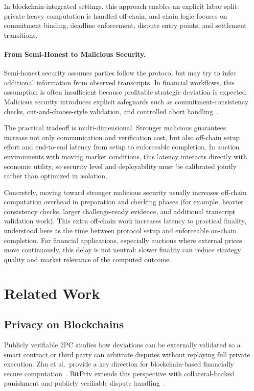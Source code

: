 \documentclass[final,twoside]{vutinfth}
\begin{document}
In blockchain-integrated settings, this approach enables an explicit labor split: private heavy computation is handled off-chain, and chain logic focuses on commitment binding, deadline enforcement, dispute entry points, and settlement transitions.

\paragraph*{From Semi-Honest to Malicious Security.}
Semi-honest security assumes parties follow the protocol but may try to infer additional information from observed transcripts. In financial workflows, this assumption is often insufficient because profitable strategic deviation is expected. Malicious security introduces explicit safeguards such as commitment-consistency checks, cut-and-choose-style validation, and controlled abort handling~\cite{LindellPinkas2008}.

The practical tradeoff is multi-dimensional. Stronger malicious guarantees increase not only communication and verification cost, but also off-chain setup effort and end-to-end latency from setup to enforceable completion. In auction environments with moving market conditions, this latency interacts directly with economic utility, so security level and deployability must be calibrated jointly rather than optimized in isolation.

Concretely, moving toward stronger malicious security usually increases off-chain computation overhead in preparation and checking phases (for example, heavier consistency checks, larger challenge-ready evidence, and additional transcript validation work). This extra off-chain work increases latency to practical finality, understood here as the time between protocol setup and enforceable on-chain completion. For financial applications, especially auctions where external prices move continuously, this delay is not neutral: slower finality can reduce strategy quality and market relevance of the computed outcome.

\section{Related Work}

\subsection{Privacy on Blockchains}
Publicly verifiable 2PC studies how deviations can be externally validated so a smart contract or third party can arbitrate disputes without replaying full private execution. Zhu et al.\ provide a key direction for blockchain-based financially secure computation~\cite{Zhu2019PV2PC}. BitPriv extends this perspective with collateral-backed punishment and publicly verifiable dispute handling~\cite{BitPriv2025}.
\end{document}
